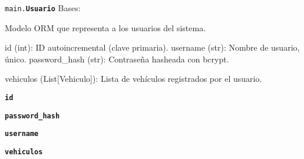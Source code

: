 \documentclass[a4paper,11pt,spanish]{sphinxmanual}
\newcommand{\robotoMonoBold}{\fontseries{b}\selectfont\ttfamily}
\renewcommand{\sphinxcode}[1]{\textcolor{sphinxorangeCode}{{\robotoMonoBold #1}}}
\renewcommand{\sphinxbfcode}[1]{\textbf{\sphinxcode{#1}}}
\renewcommand{\sphinxupquote}[1]{\texttt{#1}}
\begin{document}
\begin{fulllineitems}
\label{\detokenize{modelos:main.Usuario}}
\pysigstartsignatures
\pysiglinewithargsret
{\sphinxbfcode{\sphinxupquote{}}\sphinxcode{\sphinxupquote{main.}}\sphinxbfcode{\sphinxupquote{Usuario}}}
{}
{}
\pysigstopsignatures
\sphinxAtStartPar
Bases: {\hyperref[\detokenize{modelos:main.Base}]{\sphinxcrossref{\sphinxcode{\sphinxupquote{Base}}}}}

\sphinxAtStartPar
Modelo ORM que representa a los usuarios del sistema.
\begin{description}
\sphinxAtStartPar
id (int): ID autoincremental (clave primaria).
username (str): Nombre de usuario, único.
password\_hash (str): Contraseña hasheada con bcrypt.

\sphinxAtStartPar
vehiculos (List{[}Vehiculo{]}): Lista de vehículos registrados por el usuario.

\end{description}

\begin{fulllineitems}
\label{\detokenize{modelos:main.Usuario.id}}
\pysigstartsignatures
\pysigline
{\sphinxbfcode{\sphinxupquote{id}}}
\pysigstopsignatures
\end{fulllineitems}


\begin{fulllineitems}
\label{\detokenize{modelos:main.Usuario.password_hash}}
\pysigstartsignatures
\pysigline
{\sphinxbfcode{\sphinxupquote{password\_hash}}}
\pysigstopsignatures
\end{fulllineitems}


\begin{fulllineitems}
\label{\detokenize{modelos:main.Usuario.username}}
\pysigstartsignatures
\pysigline
{\sphinxbfcode{\sphinxupquote{username}}}
\pysigstopsignatures
\end{fulllineitems}


\begin{fulllineitems}
\label{\detokenize{modelos:main.Usuario.vehiculos}}
\pysigstartsignatures
\pysigline
{\sphinxbfcode{\sphinxupquote{vehiculos}}}
\pysigstopsignatures
\end{fulllineitems}


\end{fulllineitems}
\end{document}
